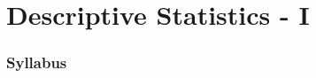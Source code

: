 \documentclass[
10pt, %
a4paper, %
]{report}
\begin{document}
\pagestyle{myheadings} %



\thispagestyle{plain} %

\printtitle %

\tableofcontents
\part{Descriptive Statistics - I} 

\section{Syllabus}
\end{document}
